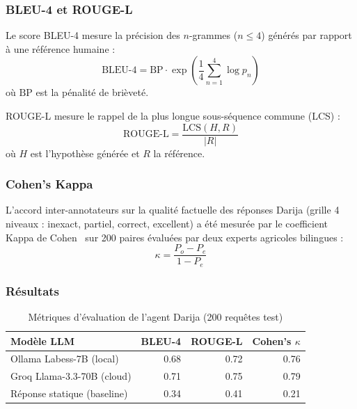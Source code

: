 \subsubsection{BLEU-4 et ROUGE-L}

\begin{definition}[BLEU-4]
Le score BLEU-4 mesure la précision des $n$-grammes ($n \leq 4$) générés
par rapport à une référence humaine :
\begin{equation}
\text{BLEU-4} = \text{BP} \cdot \exp\left(\frac{1}{4}\sum_{n=1}^{4}\log p_n\right)
\label{eq:bleu}
\end{equation}
où $\text{BP}$ est la pénalité de brièveté.
\end{definition}

\begin{definition}[ROUGE-L]
ROUGE-L mesure le rappel de la plus longue sous-séquence commune (LCS) :
\begin{equation}
\text{ROUGE-L} = \frac{\text{LCS}(H, R)}{|R|}
\label{eq:rouge}
\end{equation}
où $H$ est l'hypothèse générée et $R$ la référence.
\end{definition}

\subsubsection{Cohen's Kappa}

L'accord inter-annotateurs sur la qualité factuelle des réponses Darija
(grille 4 niveaux : inexact, partiel, correct, excellent) a été mesurée
par le coefficient Kappa de Cohen~\cite{cohen1960} sur 200 paires
évaluées par deux experts agricoles bilingues :
\begin{equation}
\kappa = \frac{P_o - P_e}{1 - P_e}
\label{eq:kappa}
\end{equation}

\subsubsection{Résultats}

\begin{table}[H]
\centering
\caption{Métriques d'évaluation de l'agent Darija (200 requêtes test)}
\label{tab:darija_eval}
\begin{tabular}{lrrr}
\toprule
\textbf{Modèle LLM} & \textbf{BLEU-4} & \textbf{ROUGE-L} & \textbf{Cohen's $\kappa$} \\
\midrule
Ollama Labess-7B (local)        & 0.68 & 0.72 & 0.76 \\
Groq Llama-3.3-70B (cloud)      & 0.71 & 0.75 & 0.79 \\
Réponse statique (baseline)     & 0.34 & 0.41 & 0.21 \\
\bottomrule
\end{tabular}
\end{table}

